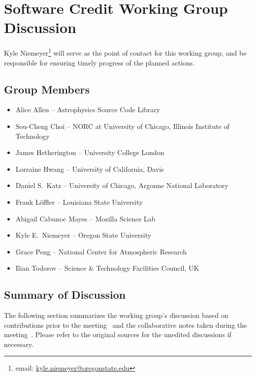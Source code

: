 \section{Software Credit Working Group Discussion}
\label{sec:appendix_SW_credit}

Kyle Niemeyer\footnote{email:
\href{mailto:kyle.niemeyer@oregonstate.edu}{kyle.niemeyer@oregonstate.edu}} will
serve as the point of contact for this working group, and be responsible for
ensuring timely progress of the planned actions.

\subsection{Group Members}

\begin{itemize}
\item Alice Allen -- Astrophysics Source Code Library 
\item Sou-Cheng Choi -- NORC at University of Chicago, Illinois Institute of Technology
\item James Hetherington -- University College London
\item Lorraine Hwang -- University of California, Davis
\item Daniel S.\ Katz -- University of Chicago, Argonne National Laboratory
\item Frank L\"{o}ffler -- Louisiana State University
\item Abigail Cabunoc Mayes -- Mozilla Science Lab
\item Kyle E.\ Niemeyer -- Oregon State University
\item Grace Peng -- National Center for Atmospheric Research
\item Ilian Todorov -- Science \& Technology Facilities Council, UK
\end{itemize}


\subsection{Summary of Discussion}

The following section summarizes the working group's discussion based on
contributions prior to the meeting~\cite{WSSSPE3-SC-github-issues} and the
collaborative notes taken during the meeting~\cite{WSSSPE3-SC-google-notes}.
Please refer to the original sources for the unedited discussions if necessary.

